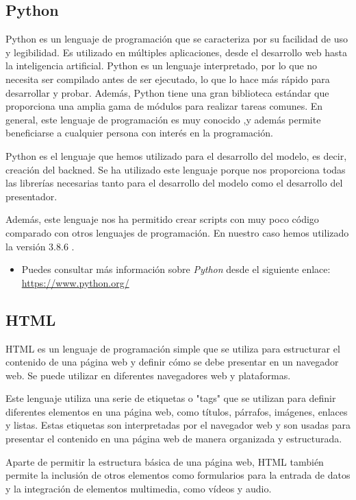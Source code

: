 \subsection{Python} \label{Python}
Python es un lenguaje de programación que se caracteriza por su facilidad de uso y legibilidad. Es utilizado en múltiples aplicaciones, desde el desarrollo web hasta la inteligencia artificial. Python es un lenguaje interpretado, por lo que no necesita ser compilado antes de ser ejecutado, lo que lo hace más rápido para desarrollar y probar. Además, Python tiene una gran biblioteca estándar que proporciona una amplia gama de módulos para realizar tareas comunes. En general, este lenguaje de programación es muy conocido ,y además permite beneficiarse a cualquier persona con interés en la programación.

Python es el lenguaje que hemos utilizado para el desarrollo del modelo, es decir, creación del backned. Se ha utilizado este lenguaje porque nos proporciona todas las librerías necesarias tanto para el desarrollo del modelo como el desarrollo del presentador.

Además, este lenguaje nos ha permitido crear scripts con muy poco código comparado con otros lenguajes de programación. En nuestro caso hemos utilizado la versión  3.8.6 .

\begin{itemize}
    \item Puedes consultar más información sobre \textit{Python}  desde el siguiente enlace: \url{https://www.python.org/}
\end{itemize}

\subsection{HTML} \label{HTML}

HTML es un lenguaje de programación simple que se utiliza para estructurar el contenido de una página web y definir cómo se debe presentar en un navegador web. Se puede utilizar en diferentes navegadores web y plataformas.

Este lenguaje utiliza una serie de etiquetas o "tags" que se utilizan para definir diferentes elementos en una página web, como títulos, párrafos, imágenes, enlaces y listas. Estas etiquetas son interpretadas por el navegador web y son usadas para presentar el contenido en una página web de manera organizada y estructurada.

Aparte de permitir la estructura básica de una página web, HTML también permite la inclusión de otros elementos como formularios para la entrada de datos y la integración de elementos multimedia, como vídeos y audio.

